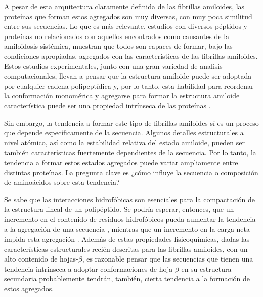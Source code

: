 A pesar de esta arquitectura claramente definida de las fibrillas amiloides, las proteínas que forman estos agregados son muy diversas, con muy poca similitud entre sus secuencias.
Lo que es más relevante, estudios con diversos péptidos y proteínas no relacionados con aquellos encontrados como causantes de la amiloidosis sistémica, muestran que todos son capaces de formar, 
bajo las condiciones apropiadas, agregados con las características de las fibrillas amiloides.
Estos estudios experimentales, junto con una gran variedad de analisis computacionales, llevan a pensar que la estructura amiloide puede ser adoptada por cualquier cadena polipeptídica y, por lo tanto, 
esta habilidad para reordenar la conformación monomérica y agregarse para formar la estructura amiloide característica puede ser una propiedad intrínseca de las proteínas \cite{fandrich2002behaviour}.

Sin  embargo, la tendencia a formar este tipo de fibrillas amiloides sí es un proceso que depende específicamente de la secuencia. Algunos detalles estructurales a nivel atómico, 
así como la estabilidad relativa del estado amiloide, pueden ser también características fuertemente dependientes de la secuencia. %
Por lo tanto, la tendencia a formar estos estados agregados puede variar ampliamente entre distintas proteínas. La pregunta clave es ¿cómo influye la secuencia o composición de aminoácidos sobre esta tendencia?

Se sabe que las interacciones hidrofóbicas son esenciales para la compactación de la estructura lineal de un polipéptido.
Se podría esperar, entonces, que un incremento en el contenido de residuos hidrofóbicos pueda aumentar la tendencia a la agregación de una secuencia \cite{hilbich1992substitutions}, 
mientras que un incremento en la carga neta impida esta agregación \cite{fraser1994conformation}. 
Además de estas propiedades fisicoquímicas, dadas las características estructurales recién descritas para las fibrillas amiloides, con un alto contenido de hojas-$\beta$, 
es razonable pensar que las secuencias que tienen una tendencia intrínseca a adoptar conformaciones de hoja-$\beta$ en su estructura secundaria probablemente tendrán, también, cierta tendencia a la formación de estos agregados.  


